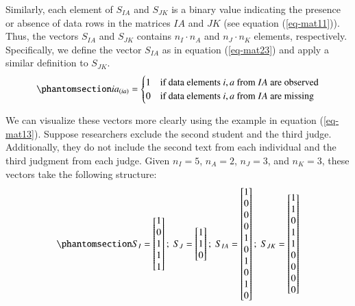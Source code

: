 \documentclass[
  authoryear,
  review,
  1p]{elsarticle}
\begin{document}
Similarly, each element of \(S_{IA}\) and \(S_{JK}\) is a binary value
indicating the presence or absence of data rows in the matrices \(IA\)
and \(JK\) (see equation (\ref{eq-mat11})). Thus, the vectors \(S_{IA}\)
and \(S_{JK}\) contains \(n_{I} \cdot n_{A}\) and \(n_{J} \cdot n_{K}\)
elements, respectively. Specifically, we define the vector \(S_{IA}\) as
in equation (\ref{eq-mat23}) and apply a similar definition to
\(S_{JK}\). \begin{equation}\phantomsection\label{eq-mat23}{
ia_{(ia)} = \begin{cases} 
1 & \text{if data elements } i,a \text{ from } IA \text{ are observed} \\
0 & \text{if data elements } i,a \text{ from } IA \text{ are missing}
\end{cases}
}\end{equation}

We can visualize these vectors more clearly using the example in
equation (\ref{eq-mat13}). Suppose researchers exclude the second
student and the third judge. Additionally, they do not include the
second text from each individual and the third judgment from each judge.
Given \(n_{I} = 5\), \(n_{A} = 2\), \(n_{J} = 3\), and \(n_{K} = 3\),
these vectors take the following structure:
\begin{equation}\phantomsection\label{eq-mat24}{
S_{I} = \begin{bmatrix}
1 \\
0 \\
1 \\
1 \\
1
\end{bmatrix} ; \;
S_{J} = \begin{bmatrix}
1 \\
1 \\
0
\end{bmatrix} ; \;
S_{IA} = \begin{bmatrix}
1 \\
0 \\
0 \\
0 \\
1 \\
0 \\
1 \\
0 \\
1 \\
0 
\end{bmatrix} ; \;
S_{JK} = \begin{bmatrix}
1 \\
1 \\
0 \\
1 \\
1 \\
0 \\
0 \\
0 \\
0 
\end{bmatrix}
}\end{equation}
\end{document}
